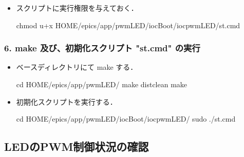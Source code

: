 \documentclass[letterpaper,10pt,dvipdfmx]{sphinxmanual}
\begin{document}
\begin{itemize}
\begin{quote}
\begin{sphinxadmonition}{warning}{Warning:}
(隘路事項) dbLoadRecord, dbLoadDatabaseの順番が逆になったりすると、うまく動作しない．しかも、".db"ファイルの１行目がおかしいというエラーメッセージがでるので、ミスリーディングである．st.cmd前後の状態も確認すべきである．
\end{sphinxadmonition}
\end{quote}

\item {} 
スクリプトに実行権限を与えておく．

\begin{sphinxVerbatim}[commandchars=\\\{\}]
\PYGZdl{} chmod u+x \PYGZdl{}HOME/epics/app/pwmLED/iocBoot/iocpwmLED/st.cmd
\end{sphinxVerbatim}

\end{itemize}


\subsubsection{6. make 及び、初期化スクリプト "st.cmd" の実行}
\label{\detokenize{epics/rst/example4__arduino_LEDcontrol02:make-st-cmd}}\begin{itemize}
\item {} 
ベースディレクトリにて make する．

\begin{sphinxVerbatim}[commandchars=\\\{\}]
\PYGZdl{} cd \PYGZdl{}HOME/epics/app/pwmLED/
\PYGZdl{} make distclean
\PYGZdl{} make
\end{sphinxVerbatim}

\item {} 
初期化スクリプトを実行する．

\begin{sphinxVerbatim}[commandchars=\\\{\}]
\PYGZdl{} cd \PYGZdl{}HOME/epics/app/pwmLED/iocBoot/iocpwmLED/
\PYGZdl{} sudo ./st.cmd
\end{sphinxVerbatim}

\end{itemize}


\subsection{LEDのPWM制御状況の確認}
\label{\detokenize{epics/rst/example4__arduino_LEDcontrol02:ledpwm}}
\end{document}
